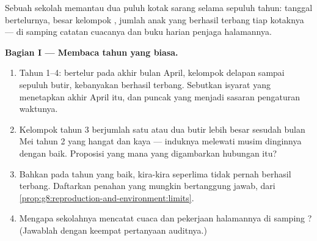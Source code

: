 \begin{problem}\label{pb:g8:reproduction-and-environment:1}
Sebuah sekolah memantau dua puluh kotak sarang selama sepuluh tahun:
tanggal bertelurnya, besar kelompok , jumlah anak yang berhasil
terbang tiap kotaknya --- di samping catatan cuacanya dan buku harian
penjaga halamannya.

\medskip\noindent\textbf{Bagian I --- Membaca tahun yang
biasa.}
\begin{enumerate}
  \item Tahun 1--4: bertelur pada akhir bulan April, kelompok 
        delapan sampai sepuluh butir, kebanyakan  berhasil
        terbang. Sebutkan isyarat yang menetapkan akhir April itu, dan
        puncak yang menjadi sasaran pengaturan waktunya.
  \item Kelompok  tahun 3 berjumlah satu atau dua butir lebih
        besar sesudah bulan Mei tahun 2 yang hangat dan kaya  ---
        induknya melewati musim dinginnya dengan baik. Proposisi yang
        mana yang digambarkan hubungan itu?
  \item Bahkan pada tahun yang baik, kira-kira seperlima  tidak
        pernah berhasil terbang. Daftarkan penahan yang mungkin
        bertanggung jawab, dari
        \cref{prop:g8:reproduction-and-environment:limits}.
  \item Mengapa sekolahnya mencatat cuaca dan pekerjaan halamannya di
        samping ? (Jawablah dengan keempat pertanyaan
        auditnya.)
\end{enumerate}


\end{problem}
